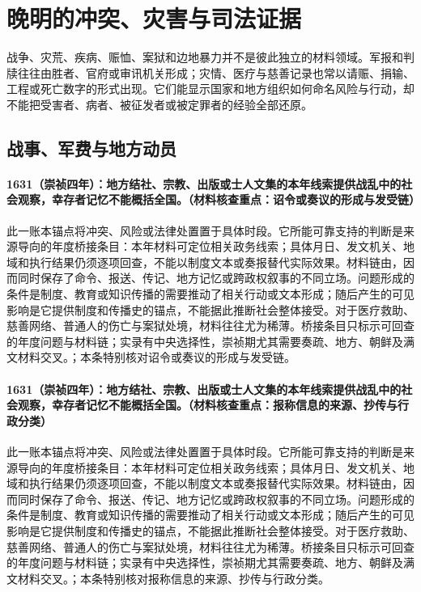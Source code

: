 \section{晚明的冲突、灾害与司法证据}

战争、灾荒、疾病、赈恤、案狱和边地暴力并不是彼此独立的材料领域。军报和判牍往往由胜者、官府或审讯机关形成；灾情、医疗与慈善记录也常以请赈、捐输、工程或死亡数字的形式出现。它们能显示国家和地方组织如何命名风险与行动，却不能把受害者、病者、被征发者或被定罪者的经验全部还原。

\subsection{战事、军费与地方动员}

\paragraph{1631（崇祯四年）：地方结社、宗教、出版或士人文集的本年线索提供战乱中的社会观察，幸存者记忆不能概括全国。（材料核查重点：诏令或奏议的形成与发受链）} 此一账本锚点将冲突、风险或法律处置置于具体时段。它所能可靠支持的判断是来源导向的年度桥接条目：本年材料可定位相关政务线索；具体月日、发文机关、地域和执行结果仍须逐项回查，不能以制度文本或奏报替代实际效果。材料链由，因而同时保存了命令、报送、传记、地方记忆或跨政权叙事的不同立场。问题形成的条件是制度、教育或知识传播的需要推动了相关行动或文本形成；随后产生的可见影响是它提供制度和传播史的锚点，不能据此推断社会整体接受。对于医疗救助、慈善网络、普通人的伤亡与案狱处境，材料往往尤为稀薄。桥接条目只标示可回查的年度问题与材料链；实录有中央选择性，崇祯期尤其需要奏疏、地方、朝鲜及满文材料交叉。；本条特别核对诏令或奏议的形成与发受链。

\paragraph{1631（崇祯四年）：地方结社、宗教、出版或士人文集的本年线索提供战乱中的社会观察，幸存者记忆不能概括全国。（材料核查重点：报称信息的来源、抄传与行政分类）} 此一账本锚点将冲突、风险或法律处置置于具体时段。它所能可靠支持的判断是来源导向的年度桥接条目：本年材料可定位相关政务线索；具体月日、发文机关、地域和执行结果仍须逐项回查，不能以制度文本或奏报替代实际效果。材料链由，因而同时保存了命令、报送、传记、地方记忆或跨政权叙事的不同立场。问题形成的条件是制度、教育或知识传播的需要推动了相关行动或文本形成；随后产生的可见影响是它提供制度和传播史的锚点，不能据此推断社会整体接受。对于医疗救助、慈善网络、普通人的伤亡与案狱处境，材料往往尤为稀薄。桥接条目只标示可回查的年度问题与材料链；实录有中央选择性，崇祯期尤其需要奏疏、地方、朝鲜及满文材料交叉。；本条特别核对报称信息的来源、抄传与行政分类。

